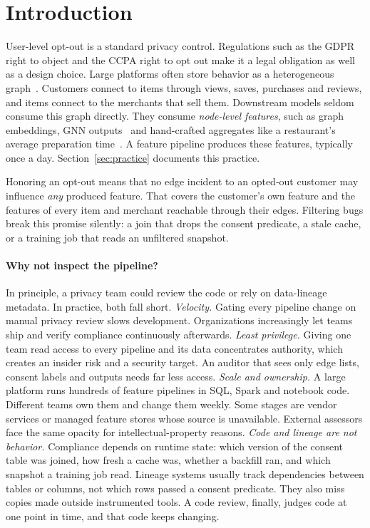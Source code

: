 \documentclass[10pt,twocolumn,letterpaper]{article}
\theoremstyle{definition}
\begin{document}
\section{Introduction}
User-level opt-out is a standard privacy control. Regulations such as the
GDPR right to object and the CCPA right to opt out make it a legal obligation
as well as a design choice. Large platforms often store behavior as a
heterogeneous graph~\citep{zhu2019aligraph,sarda2019ubereats,borisyuk2024lignn}.
Customers connect to items through views, saves, purchases and reviews, and
items connect to the merchants that sell them. Downstream models seldom
consume this graph directly. They consume \emph{node-level features}, such
as graph embeddings, GNN
outputs~\citep{hamilton2017graphsage,ying2018graph,elkishky2022twhin} and
hand-crafted aggregates like a restaurant's average preparation
time~\citep{hermann2017michelangelo}. A feature pipeline produces these
features, typically once a day. Section~\ref{sec:practice} documents this
practice.

Honoring an opt-out means that no edge incident to an opted-out customer may
influence \emph{any} produced feature. That covers the customer's own
feature and the features of every item and merchant reachable through their
edges. Filtering bugs break this promise silently: a join that drops the
consent predicate, a stale cache, or a training job that reads an
unfiltered snapshot.

\paragraph{Why not inspect the pipeline?}
In principle, a privacy team could review the code or rely on data-lineage
metadata. In practice, both fall short.
\emph{Velocity.} Gating every pipeline change on manual privacy review slows
development. Organizations increasingly let teams ship and verify compliance
continuously afterwards.
\emph{Least privilege.} Giving one team read access to every pipeline and its
data concentrates authority, which creates an insider risk and a security
target. An auditor that sees only edge lists, consent labels and outputs
needs far less access.
\emph{Scale and ownership.} A large platform runs hundreds of feature
pipelines in SQL, Spark and notebook code. Different teams own them and change
them weekly. Some stages are vendor services or managed feature stores whose
source is unavailable. External assessors face the same opacity for
intellectual-property reasons.
\emph{Code and lineage are not behavior.} Compliance depends on runtime state:
which version of the consent table was joined, how fresh a cache was, whether
a backfill ran, and which snapshot a training job read. Lineage systems
usually track dependencies between tables or columns, not which rows passed a
consent predicate. They also miss copies made outside instrumented tools. A
code review, finally, judges code at one point in time, and that code keeps
changing.
\end{document}
